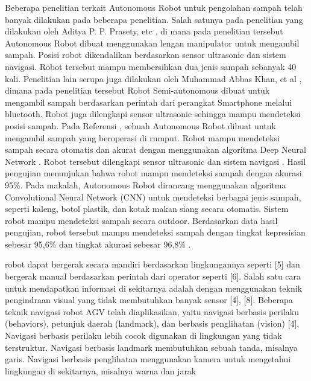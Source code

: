 \begin{enumerate}
 	Beberapa penelitian terkait Autonomous Robot untuk pengolahan sampah telah banyak dilakukan pada beberapa penelitian. Salah satunya pada penelitian yang dilakukan oleh Aditya P. P. Prasety, etc \cite{Prasetyo2020}, di mana pada penelitian tersebut Autonomous Robot dibuat menggunakan lengan manipulator untuk mengambil sampah. Posisi robot dikendalikan berdasarkan sensor ultrasonic dan sistem navigasi. Robot tersebut mampu membersihkan dua jenis sampah sebanyak 40 kali. Penelitian lain serupa juga dilakukan oleh Muhammad Abbas Khan, et al \cite{Khan2020}, dimana pada penelitian tersebut Robot Semi-autonomous dibuat untuk mengambil sampah berdasarkan perintah dari perangkat Smartphone melalui bluetooth. Robot juga dilengkapi sensor ultrasonic sehingga mampu mendeteksi posisi sampah. Pada Referensi \cite{Bai2018}, sebuah Autonomous Robot dibuat untuk mengambil sampah yang beroperasi di rumput. Robot mampu mendeteksi sampah secara otomatis dan akurat dengan menggunakan algoritma Deep Neural Network \cite{Kong2009}. Robot tersebut dilengkapi sensor ultrasonic\cite{Michael2008} dan sistem navigasi \cite{Wang2008}. Hasil pengujian menunjukan bahwa robot mampu mendeteksi sampah dengan akurasi 95\%. Pada makalah\cite{Arai2019}, Autonomous Robot dirancang menggunakan algoritma Convolutional Neural Network (CNN) untuk mendeteksi berbagai jenis sampah, seperti kaleng, botol plastik, dan kotak makan siang secara otomatis. Sistem robot mampu mendeteksi sampah secara outdoor. Berdasarkan data hasil pengujian\cite{Arai2019}, robot tersebut mampu mendeteksi sampah dengan tingkat kepresisian sebesar 95,6\% dan tingkat akurasi sebesar 96,8\% .
 	
 	
 	robot dapat bergerak secara mandiri berdasarkan lingkungannya seperti [5] dan bergerak manual berdasarkan perintah dari operator seperti [6]. Salah satu cara untuk mendapatkan informasi di sekitarnya adalah dengan menggunakan teknik pengindraan visual yang tidak membutuhkan banyak sensor [4], [8].
 	Beberapa teknik navigasi robot AGV telah diaplikasikan, yaitu navigasi berbasis perilaku (behaviors), petunjuk daerah (landmark), dan berbasis
 	penglihatan (vision) [4]. Navigasi berbasis perilaku lebih cocok digunakan di lingkungan yang tidak terstruktur. Navigasi berbasis landmark membutuhkan
 	sebuah tanda, misalnya garis. Navigasi berbasis penglihatan menggunakan kamera untuk mengetahui lingkungan di sekitarnya, misalnya warna dan jarak
 	

\end{enumerate}

